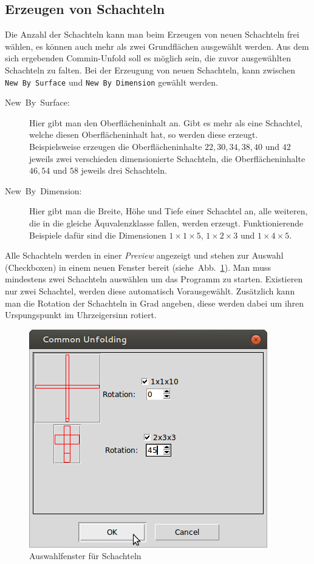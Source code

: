 \subsection{Erzeugen von Schachteln}
\label{subsec:schachteln}

Die Anzahl der Schachteln kann man beim Erzeugen von neuen Schachteln frei wählen, \dH es können auch mehr als zwei Grundflächen ausgewählt werden. Aus dem sich ergebenden Commin-Unfold soll es möglich sein, die zuvor ausgewählten Schachteln zu falten. Bei der Erzeugung von neuen Schachteln, kann zwischen \texttt{New By Surface} und \texttt{New By Dimension} gewählt werden.

  \begin{description}
    \item [{New~By~Surface:}] Hier gibt man den Oberflächeninhalt an. Gibt es mehr als eine Schachtel, welche diesen Oberflächeninhalt hat, so werden diese erzeugt. Beispielsweise erzeugen die Oberflächeninhalte $22, 30, 34, 38, 40$ und $42$ jeweils zwei verschieden dimensionierte Schachteln, die Oberflächeninhalte $46, 54$ und $58$ jeweils drei Schachteln.
    \item [{New~By~Dimension:}] Hier gibt man die Breite, Höhe und Tiefe einer Schachtel an, alle weiteren, die in die gleiche Äquvalenzklasse fallen, werden erzeugt. Funktionierende Beispiele dafür sind die Dimensionen $1\times1\times5$, $1\times2\times3$ und $1\times4\times5$.
  \end{description}

Alle Schachteln werden in einer \emph{Preview} angezeigt und stehen zur Auswahl (Checkboxen) in einem neuen Fenster bereit (siehe~Abb.~\ref{fig:preview}). Man muss mindestens zwei Schachteln auswählen um das Programm zu starten. Existieren nur zwei Schachtel, werden diese automatisch Vorausgewählt. Zusätzlich kann man die Rotation der Schachteln in Grad angeben, diese werden dabei um ihren Urspungspunkt im Uhrzeigersinn rotiert.

\begin{figure}[htbp]
  \centering
  \includegraphics[scale=0.5]{03_pics/auswahl.jpg}
  \caption{Auswahlfenster für Schachteln}
  \label{fig:preview}
\end{figure}


